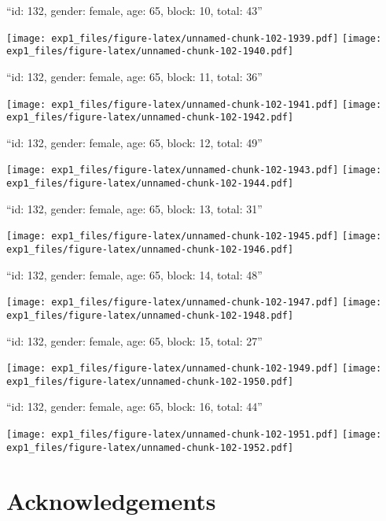 \documentclass[11pt,,]{article}
\begin{document}
\newpage
[1] 

``id: 132, gender: female, age: 65, block: 10, total: 43''

\texttt{[image: exp1\_files/figure-latex/unnamed-chunk-102-1939.pdf]}
\texttt{[image: exp1\_files/figure-latex/unnamed-chunk-102-1940.pdf]}

\newpage
[1] 

``id: 132, gender: female, age: 65, block: 11, total: 36''

\texttt{[image: exp1\_files/figure-latex/unnamed-chunk-102-1941.pdf]}
\texttt{[image: exp1\_files/figure-latex/unnamed-chunk-102-1942.pdf]}

\newpage
[1] 

``id: 132, gender: female, age: 65, block: 12, total: 49''

\texttt{[image: exp1\_files/figure-latex/unnamed-chunk-102-1943.pdf]}
\texttt{[image: exp1\_files/figure-latex/unnamed-chunk-102-1944.pdf]}

\newpage
[1] 

``id: 132, gender: female, age: 65, block: 13, total: 31''

\texttt{[image: exp1\_files/figure-latex/unnamed-chunk-102-1945.pdf]}
\texttt{[image: exp1\_files/figure-latex/unnamed-chunk-102-1946.pdf]}

\newpage
[1] 

``id: 132, gender: female, age: 65, block: 14, total: 48''

\texttt{[image: exp1\_files/figure-latex/unnamed-chunk-102-1947.pdf]}
\texttt{[image: exp1\_files/figure-latex/unnamed-chunk-102-1948.pdf]}

\newpage
[1] 

``id: 132, gender: female, age: 65, block: 15, total: 27''

\texttt{[image: exp1\_files/figure-latex/unnamed-chunk-102-1949.pdf]}
\texttt{[image: exp1\_files/figure-latex/unnamed-chunk-102-1950.pdf]}

\newpage
[1] 

``id: 132, gender: female, age: 65, block: 16, total: 44''

\texttt{[image: exp1\_files/figure-latex/unnamed-chunk-102-1951.pdf]}
\texttt{[image: exp1\_files/figure-latex/unnamed-chunk-102-1952.pdf]}

\newpage

\section{Acknowledgements}\label{acknowledgements}
\end{document}
